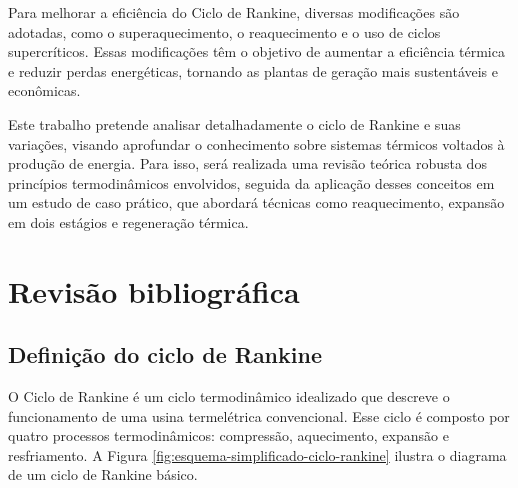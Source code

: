 \documentclass[
	article,			%
	11pt,				%
	oneside,			%
	a4paper,			%
	english,			%
	brazil,				%
	sumario=tradicional
	]{abntex2}
\begin{document}
Para melhorar a eficiência do Ciclo de Rankine, diversas modificações são adotadas, como o superaquecimento, o reaquecimento e o uso de ciclos supercríticos. Essas modificações têm o objetivo de aumentar a eficiência térmica e reduzir perdas energéticas, tornando as plantas de geração mais sustentáveis e econômicas.

Este trabalho pretende analisar detalhadamente o ciclo de Rankine e suas variações, visando aprofundar o conhecimento sobre sistemas térmicos voltados à produção de energia. Para isso, será realizada uma revisão teórica robusta dos princípios termodinâmicos envolvidos, seguida da aplicação desses conceitos em um estudo de caso prático, que abordará técnicas como reaquecimento, expansão em dois estágios e regeneração térmica.

\section{Revisão bibliográfica}

\subsection{Definição do ciclo de Rankine}

O Ciclo de Rankine é um ciclo termodinâmico idealizado que descreve o funcionamento de uma usina termelétrica convencional. Esse ciclo é composto por quatro processos termodinâmicos: compressão, aquecimento, expansão e resfriamento. A Figura \ref{fig:esquema-simplificado-ciclo-rankine} ilustra o diagrama de um ciclo de Rankine básico.
\end{document}
